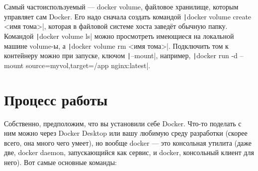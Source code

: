 \documentclass{../../text-style}
\begin{document}
Самый частоиспользуемый --- docker volume, файловое хранилище, которым управляет сам Docker. Его надо сначала создать командой \texttt|docker volume create <имя тома>|, которая в файловой системе хоста заведёт обычную папку. Командой \texttt|docker volume ls| можно просмотреть имеющиеся на локальной машине volume-ы, а \texttt|docker volume rm <имя тома>|. Подключить том к контейнеру можно при запуске, ключом \texttt|--mount|, например, \texttt|docker run -d --mount source=myvol,target=/app nginx:latest|.

\section{Процесс работы}

Собственно, предположим, что вы установили себе Docker. Что-то поделать с ним можно через Docker Desktop или вашу любимую среду разработки (скорее всего, она много чего умеет), но вообще docker --- это консольная утилита (даже две, docker daemon, запускающийся как сервис, и docker, консольный клиент для него). Вот самые основные команды:
\end{document}
